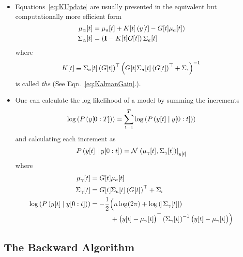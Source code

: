 \begin{itemize}
\item Equations~\eqref{eq:KUpdate} are usually presented in the
  equivalent but computationally more efficient form
  \begin{align*}
    {\mu_\alpha}{[t]} &= {\mu_a}{[t]} + {K}{[t]} \left( {y}{[t]} -
    {G}{[t]} {\mu_a}{[t]} \right) \\
    {\Sigma_\alpha}{[t]} &= \left( {\bf I} - {K}{[t]} {G}{[t]} \right) {\Sigma_a}{[t]} 
  \end{align*}
  where
  \begin{equation*}
    {K}{[t]} \equiv {\Sigma_a}{[t]} \left( {G}{[t]} \right)^\top \left( {G}{[t]} {\Sigma_a}{[t]} \left( {G}{[t]} \right)^\top + \Sigma_\epsilon \right)^{-1}
  \end{equation*}
  is called \emph{the } %
  (See Eqn.~\eqref{eq:KalmanGain}.).
\item One can calculate the log likelihood of a model by summing the
  increments
  \begin{equation*}
    \log\left( P\left(y[0:T] \right)\right) = \sum_{t=1}^T
    \log\left(P \left({y}{[t]}\mid y[0:t] \right) \right)
  \end{equation*}
  and calculating each increment as
  \begin{equation*}
    P \left({y}{[t]}\mid y[0:t] \right) =
    {\mathcal{N}}\left.\left({\mu_\gamma}{[t]},{\Sigma_\gamma}{[t]}\right)\right|_{{y}{[t]}}
  \end{equation*}
  where
  \begin{align*}
    {\mu_\gamma}{[t]} &= {G}{[t]} {\mu_a}{[t]}\\
    {\Sigma_\gamma}{[t]} &= {G}{[t]} {\Sigma_a}{[t]} \left(
    {G}{[t]} \right)^\top + \Sigma_\epsilon\\
    \log\left( P \left({y}{[t]}\mid y[0:t] \right) \right) &= -
    \frac{1}{2} \Big( n \log(2\pi) + \log \left( \left|
    {\Sigma_\gamma}{[t]} \right| \right) \\ & \quad \quad \quad
    + \big( {y}{[t]} - {\mu_\gamma}{[t]} \big)^\top
    \left( {\Sigma_\gamma}{[t]} \right)^{-1}
    \big( {y}{[t]} - {\mu_\gamma}{[t]} \big)
    \Big)
  \end{align*}
\end{itemize}

\subsection{The Backward Algorithm}

